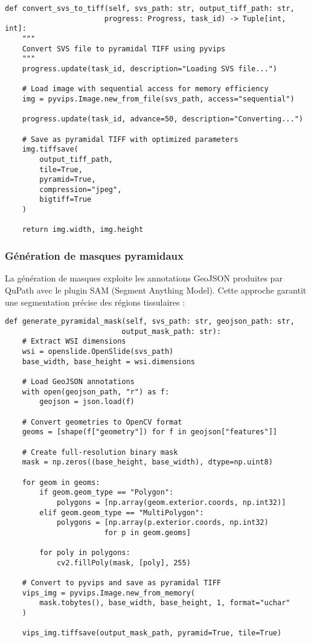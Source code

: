 \documentclass[12pt,a4paper]{report}
\begin{document}
\begin{lstlisting}[caption=Extrait du module de conversion SVS]
def convert_svs_to_tiff(self, svs_path: str, output_tiff_path: str, 
                       progress: Progress, task_id) -> Tuple[int, int]:
    """
    Convert SVS file to pyramidal TIFF using pyvips
    """
    progress.update(task_id, description="Loading SVS file...")
    
    # Load image with sequential access for memory efficiency
    img = pyvips.Image.new_from_file(svs_path, access="sequential")
    
    progress.update(task_id, advance=50, description="Converting...")
    
    # Save as pyramidal TIFF with optimized parameters
    img.tiffsave(
        output_tiff_path,
        tile=True,
        pyramid=True,
        compression="jpeg",
        bigtiff=True
    )
    
    return img.width, img.height
\end{lstlisting}

\subsubsection{Génération de masques pyramidaux}

La génération de masques exploite les annotations GeoJSON produites par QuPath avec le plugin SAM (Segment Anything Model). Cette approche garantit une segmentation précise des régions tissulaires :

\begin{lstlisting}[caption=Algorithme de génération de masque pyramidal]
def generate_pyramidal_mask(self, svs_path: str, geojson_path: str, 
                           output_mask_path: str):
    # Extract WSI dimensions
    wsi = openslide.OpenSlide(svs_path)
    base_width, base_height = wsi.dimensions
    
    # Load GeoJSON annotations
    with open(geojson_path, "r") as f:
        geojson = json.load(f)
    
    # Convert geometries to OpenCV format
    geoms = [shape(f["geometry"]) for f in geojson["features"]]
    
    # Create full-resolution binary mask
    mask = np.zeros((base_height, base_width), dtype=np.uint8)
    
    for geom in geoms:
        if geom.geom_type == "Polygon":
            polygons = [np.array(geom.exterior.coords, np.int32)]
        elif geom.geom_type == "MultiPolygon":
            polygons = [np.array(p.exterior.coords, np.int32) 
                       for p in geom.geoms]
        
        for poly in polygons:
            cv2.fillPoly(mask, [poly], 255)
    
    # Convert to pyvips and save as pyramidal TIFF
    vips_img = pyvips.Image.new_from_memory(
        mask.tobytes(), base_width, base_height, 1, format="uchar"
    )
    
    vips_img.tiffsave(output_mask_path, pyramid=True, tile=True)
\end{lstlisting}
\end{document}
